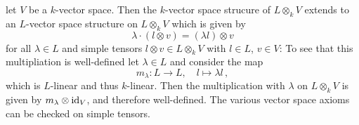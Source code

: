 \begin{fluff}
  let $V$ be a $k$-vector space.
  Then the $k$-vector space strucure of $L \otimes_k V$ extends to an $L$-vector space structure on $L \otimes_k V$ which is given by
  \[
      \lambda \cdot (l \otimes v)
    = (\lambda l) \otimes v
  \]
  for all $\lambda \in L$ and simple tensors $l \otimes v \in L \otimes_k V$ with $l \in L$, $v \in V$:
  To see that this multipliation is well-defined let $\lambda \in L$ and consider the map
  \[
            m_\lambda
    \colon  L
    \to     L,
    \quad   l
    \mapsto \lambda l \,,
  \]
  which is $L$-linear and thus $k$-linear.
  Then the multiplication with $\lambda$ on $L \otimes_k V$ is given by $m_\lambda \otimes \operatorname{id}_V$, and therefore well-defined.
  The various vector space axioms can be checked on simple tensors.

\end{fluff}
